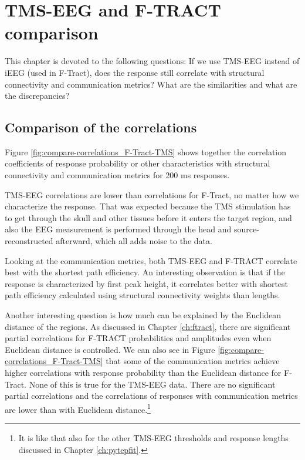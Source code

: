 \chapter{TMS-EEG and F-TRACT comparison}\label{ch:compare}

This chapter is devoted to the following questions: If we use TMS-EEG instead of iEEG (used in F-Tract), does the response still correlate with structural connectivity and communication metrics?  What are the similarities and what are the discrepancies? 

\section{Comparison of the correlations}\label{sec:compare-correlations_F-Tract-TMS}

Figure \ref{fig:compare-correlations_F-Tract-TMS} shows together the correlation coefficients of response probability or other characteristics with structural connectivity and communication metrics for 200 ms responses. 

TMS-EEG correlations are lower than correlations for F-Tract, no matter how we characterize the response. That was expected because the TMS stimulation has to get through the skull and other tissues before it enters the target region, and also the EEG measurement is performed through the head and source-reconstructed afterward, which all adds noise to the data.

Looking at the communication metrics, both TMS-EEG and F-TRACT correlate best with the shortest path efficiency. An interesting observation is that if the response is characterized by first peak height, it correlates better with shortest path efficiency calculated using structural connectivity weights than lengths.

Another interesting question is how much can be explained by the Euclidean distance of the regions. As discussed in Chapter \ref{ch:ftract}, there are significant partial correlations for F-TRACT probabilities and amplitudes even when Euclidean distance is controlled. We can also see in Figure \ref{fig:compare-correlations_F-Tract-TMS} that some of the communication metrics achieve higher correlations with response probability than the Euclidean distance for F-Tract. None of this is true for the TMS-EEG data. There are no significant partial correlations and the correlations of responses with communication metrics are lower than with Euclidean distance.\footnote{It is like that also for the other TMS-EEG thresholds and response lengths discussed in Chapter \ref{ch:pytepfit}.} 

